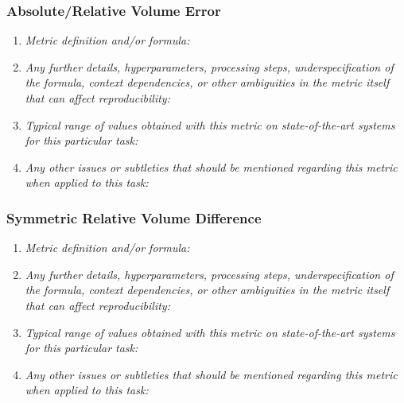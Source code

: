 \documentclass[a4paper,11pt]{article}
\begin{document}
        \subsubsection{Absolute/Relative Volume Error}
            \begin{enumerate}[label=\alph*.]
                \item \textit{Metric definition and/or formula:}
                \bigskip
                \item \textit{Any further details, hyperparameters, processing steps, underspecification of the formula, context dependencies, or other ambiguities in the metric itself that can affect reproducibility:}
                \bigskip
                \item \textit{Typical range of values obtained with this metric on state-of-the-art systems for this particular task:}
                \bigskip
                \item \textit{Any other issues or subtleties that should be mentioned regarding this metric when applied to this task:}
                \bigskip
            \end{enumerate}
        \subsubsection{Symmetric Relative Volume Difference}
            \begin{enumerate}[label=\alph*.]
                \item \textit{Metric definition and/or formula:}
                \bigskip
                \item \textit{Any further details, hyperparameters, processing steps, underspecification of the formula, context dependencies, or other ambiguities in the metric itself that can affect reproducibility:}
                \bigskip
                \item \textit{Typical range of values obtained with this metric on state-of-the-art systems for this particular task:}
                \bigskip
                \item \textit{Any other issues or subtleties that should be mentioned regarding this metric when applied to this task:}
                \bigskip
            \end{enumerate}
\end{document}
